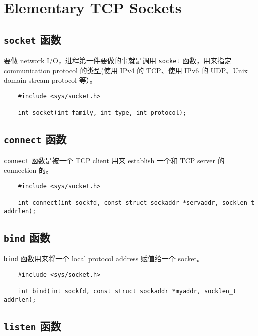 \section{Elementary TCP Sockets}

  \subsection{\texttt{socket} 函数}

    要做 network I/O，进程第一件要做的事就是调用 \texttt{socket} 函数，用来指定 communication protocol 的类型(使用 IPv4 的 TCP、使用 IPv6 的 UDP、Unix domain stream protocol 等）。

    \begin{verbatim}
    #include <sys/socket.h>

    int socket(int family, int type, int protocol);
    \end{verbatim}

  \subsection{\texttt{connect} 函数}
  

    \texttt{connect} 函数是被一个 TCP client 用来 establish 一个和 TCP server 的 connection 的。

    \begin{verbatim}
    #include <sys/socket.h>

    int connect(int sockfd, const struct sockaddr *servaddr, socklen_t addrlen);
    \end{verbatim}

  \subsection{\texttt{bind} 函数}

    \texttt{bind} 函数用来将一个 local protocol address 赋值给一个 socket。

    \begin{verbatim}
    #include <sys/socket.h>

    int bind(int sockfd, const struct sockaddr *myaddr, socklen_t addrlen);
    \end{verbatim}

  \subsection{\texttt{listen} 函数}

